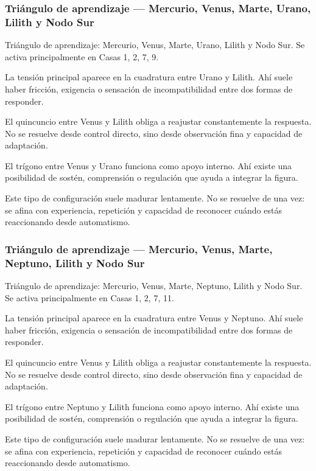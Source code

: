 \documentclass[11pt,a4paper]{article}
\begin{document}
\subsubsection*{Triángulo de aprendizaje — Mercurio, Venus, Marte, Urano, Lilith y Nodo Sur}
Triángulo de aprendizaje: Mercurio, Venus, Marte, Urano, Lilith y Nodo Sur. Se activa principalmente en Casas 1, 2, 7, 9.

La tensión principal aparece en la cuadratura entre Urano y Lilith. Ahí suele haber fricción, exigencia o sensación de incompatibilidad entre dos formas de responder.

El quincuncio entre Venus y Lilith obliga a reajustar constantemente la respuesta. No se resuelve desde control directo, sino desde observación fina y capacidad de adaptación.

El trígono entre Venus y Urano funciona como apoyo interno. Ahí existe una posibilidad de sostén, comprensión o regulación que ayuda a integrar la figura.

Este tipo de configuración suele madurar lentamente. No se resuelve de una vez: se afina con experiencia, repetición y capacidad de reconocer cuándo estás reaccionando desde automatismo.

\subsubsection*{Triángulo de aprendizaje — Mercurio, Venus, Marte, Neptuno, Lilith y Nodo Sur}
Triángulo de aprendizaje: Mercurio, Venus, Marte, Neptuno, Lilith y Nodo Sur. Se activa principalmente en Casas 1, 2, 7, 11.

La tensión principal aparece en la cuadratura entre Venus y Neptuno. Ahí suele haber fricción, exigencia o sensación de incompatibilidad entre dos formas de responder.

El quincuncio entre Venus y Lilith obliga a reajustar constantemente la respuesta. No se resuelve desde control directo, sino desde observación fina y capacidad de adaptación.

El trígono entre Neptuno y Lilith funciona como apoyo interno. Ahí existe una posibilidad de sostén, comprensión o regulación que ayuda a integrar la figura.

Este tipo de configuración suele madurar lentamente. No se resuelve de una vez: se afina con experiencia, repetición y capacidad de reconocer cuándo estás reaccionando desde automatismo.

\end{document}
